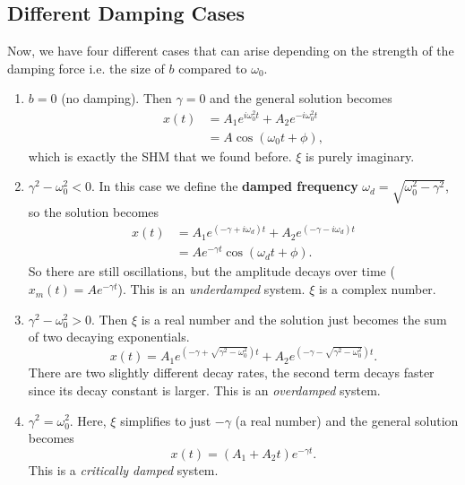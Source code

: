 \documentclass[../classical_mechanics.tex]{subfiles}
\begin{document}
        \subsection{Different Damping Cases}\label{subsec:different-damping-cases}
            Now, we have four different cases that can arise depending on the strength of the damping force i.e. the size of $b$ compared to $\omega_0$.
            \begin{enumerate}[label=\textbf{Case \arabic*}:]
                \item $b=0$ (no damping). Then $\gamma=0$ and the general solution becomes
                \begin{align}
                    x(t)&=A_1e^{i\omega_0^2t}+A_2e^{-i\omega_0^2t}\\
                    &=A\cos(\omega_0 t+\phi),
                \end{align}
                which is exactly the SHM that we found before.
                $\xi$ is purely imaginary.
                \item $\gamma^2-\omega_0^2<0$. In this case we define the \textbf{damped frequency} $\omega_d=\sqrt{\omega_0^2-\gamma^2}$, so the solution becomes
                \begin{align}
                    x(t)&=A_1e^{(-\gamma+i\omega_d)t}+A_2e^{(-\gamma-i\omega_d)t}\\
                    &=Ae^{-\gamma t}\cos(\omega_d t+\phi).
                \end{align}
                So there are still oscillations, but the amplitude decays over time ($x_m(t)=Ae^{-\gamma t}$).
                This is an \textit{underdamped} system.
                $\xi$ is a complex number.
                \item $\gamma^2-\omega_0^2>0$. Then $\xi$ is a real number and the solution just becomes the sum of two decaying exponentials.
                \begin{equation}
                    x(t)=A_1e^{(-\gamma+\sqrt{\gamma^2-\omega_0^2})t}+A_2e^{(-\gamma-\sqrt{\gamma^2-\omega_0^2})t}.
                \end{equation}
                There are two slightly different decay rates, the second term decays faster since its decay constant is larger.
                This is an \textit{overdamped} system.
                \item $\gamma^2=\omega_0^2$. Here, $\xi$ simplifies to just $-\gamma$ (a real number) and the general solution becomes
                \begin{equation}
                    x(t)=(A_1+A_2t)e^{-\gamma t}.
                \end{equation}
                This is a \textit{critically damped} system.
            \end{enumerate}
\end{document}
